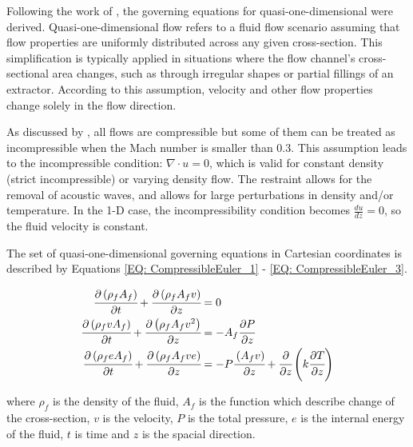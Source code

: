 \documentclass[a4paper,fleqn]{cas-dc}
\begin{document}
Following the work of \citet{Anderson1995}, the governing equations for quasi-one-dimensional were derived. Quasi-one-dimensional flow refers to a fluid flow scenario assuming that flow properties are uniformly distributed across any given cross-section. This simplification is typically applied in situations where the flow channel's cross-sectional area changes, such as through irregular shapes or partial fillings of an extractor. According to this assumption, velocity and other flow properties change solely in the flow direction.

As discussed by \citet{Anderson2023}, all flows are compressible but some of them can be treated as incompressible when the Mach number is smaller than 0.3. This assumption leads to the incompressible condition: $\nabla \cdot u =0$, which is valid for constant density (strict incompressible) or varying density flow. The restraint allows for the removal of acoustic waves, and allows for large perturbations in density and/or temperature. In the 1-D case, the incompressibility condition becomes $\frac{du}{dz} = 0$, so the fluid velocity is constant.

The set of quasi-one-dimensional governing equations in Cartesian coordinates is described by Equations \ref{EQ: CompressibleEuler_1} - \ref{EQ: CompressibleEuler_3}.

{\footnotesize
	\begin{align}
		\label{EQ: CompressibleEuler_1}
		\cfrac{\partial \left( \rho_f A_f \right) }{\partial t} + \cfrac{\partial \left( \rho_f A_f v \right)}{\partial z} &= 0 \\
		\cfrac{\partial \left( \rho_f v A_f \right) }{\partial t} + \cfrac{\partial \left( \rho_f A_f v^2 \right)}{\partial z} &= -A_f \cfrac{\partial P}{\partial z} \label{EQ: CompressibleEuler_2} \\
		\cfrac{\partial \left( \rho_f e A_f \right) }{\partial t} + \cfrac{\partial \left( \rho_f A_f v e\right)}{\partial z} &= -P\cfrac{\left( A_f v \right)}{\partial z} + \cfrac{\partial}{\partial z} \left( k \cfrac{\partial T}{\partial z} \right)   
		\label{EQ: CompressibleEuler_3}
	\end{align}  
}

where $\rho_f$ is the density of the fluid, $A_f$ is the function which describe change of the cross-section, $v$ is the velocity, $P$ is the total pressure, $e$ is the internal energy of the fluid, $t$ is time and $z$ is the spacial direction.
\end{document}

